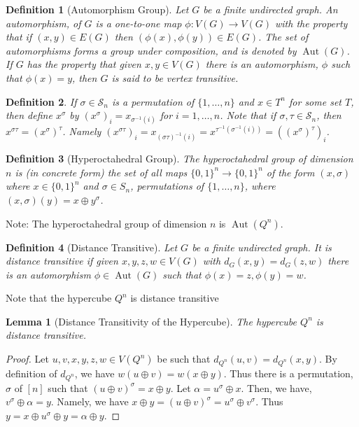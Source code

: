 \documentclass{article}
\DeclareMathOperator{\Aut}{Aut}
\newcommand{\cS}{\mathcal{S}}
\newtheorem{definition}{Definition}
\newtheorem{lemma}{Lemma}
\begin{document}
\begin{definition}[Automorphism Group]
  Let $G$ be a finite undirected graph.  An \emph{automorphism}, of
  $G$ is a one-to-one map $\phi: V(G) \rightarrow V(G)$ with the
  property that if $(x,y) \in E(G)$ then
  $(\phi(x), \phi(y)) \in E(G)$.  The set of automorphisms forms a
  group under composition, and is denoted by $\Aut(G)$.  If $G$ has
  the property that given $x, y \in V(G)$ there is an automorphism,
  $\phi$ such that $\phi(x) = y$, then $G$ is said to be \emph{vertex
    transitive}.
\end{definition}
\begin{definition}
  If $\sigma \in \cS_n$ is a permutation of $\{1, \dots, n\}$ and $x \in
  T^n$ for some set $T$, then define $x^\sigma$ by $(x^\sigma)_i =
  x_{\sigma^{-1}(i)}$ for $i=1, \dots, n$.  Note that if $\sigma, \tau
  \in \cS_n$, then $x^{\sigma \tau} = (x^{\sigma})^\tau$.  Namely
  $(x^{\sigma \tau})_i = x_{(\sigma \tau)^{-1}(i)} = x^{\tau^{-1}
    (\sigma^{-1}(i))} = ((x^\sigma)^\tau)_i$.
\end{definition}
\begin{definition}[Hyperoctahedral Group]
The \emph{hyperoctahedral group} of dimension $n$ is (in concrete
form) the set of all maps $\{0,1\}^n \rightarrow \{0,1\}^n$ of the
form $(x,\sigma)$ where $x \in \{0,1\}^n$ and $\sigma \in S_n$,
permutations of $\{1, \dots, n\}$, where $(x, \sigma) (y) = x \oplus
y^\sigma$.
  
\end{definition}
Note: The hyperoctahedral group of dimension $n$ is $\Aut(Q^n)$.

\begin{definition}[Distance Transitive]
Let $G$ be a finite undirected graph.  It is \emph{distance
  transitive} if given $x,y,z,w \in V(G)$ with $d_G(x,y) = d_G(z,w)$
there is an automorphism $\phi \in \Aut(G)$ such that $\phi(x) = z, \phi(y) = w$.
  
\end{definition}
Note that the hypercube $Q^n$ is distance transitive

\begin{lemma}[Distance Transitivity of the Hypercube]
  The hypercube $Q^n$ is distance transitive.
\end{lemma}
\begin{proof}
  Let $u,v,x,y,z,w \in V(Q^n)$ be such that $d_{Q^n}(u,v) = d_{Q^n}(x,y)$.
  By definition of $d_{Q^n}$, we have $w(u \oplus v) = w(x \oplus y)$.
  Thus there is a permutation, $\sigma$ of $[n]$ such that
  $(u \oplus v)^\sigma = x \oplus y$.  Let $\alpha = u^\sigma \oplus
  x$.  Then, we have, $v^\sigma \oplus \alpha = y$.  Namely, we have
  $x \oplus y = (u \oplus v)^\sigma = u^\sigma \oplus v^\sigma$.  Thus
  $y = x \oplus u^\sigma \oplus y = \alpha \oplus y$.
\end{proof}
\end{document}
